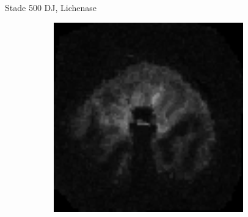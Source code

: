 \documentclass[10pt]{beamer}
\begin{document}
\begin{frame}{Stade 500 DJ, Lichenase}
\begin{figure}[ht]
\begin{subfigure}[t]{0.33\textwidth}
      
    \end{subfigure}%
    \begin{subfigure}[t]{0.33\textwidth}
      \centering
      \includegraphics[width=0.9\textwidth]{fig/stats_500Lich_density}

    \end{subfigure}%
    
  \end{figure}
\end{frame}
\end{document}
